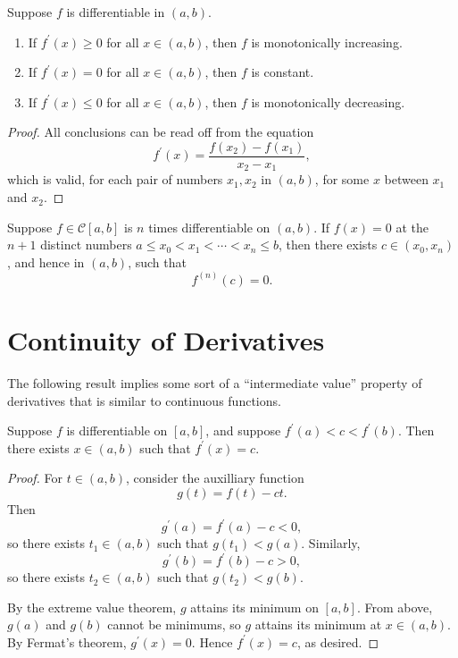 \begin{lemma}
Suppose $f$ is differentiable in $(a,b)$.
\begin{enumerate}[label=(\roman*)]
\item If $f^\prime(x)\ge0$ for all $x\in(a,b)$, then $f$ is monotonically increasing.
\item If $f^\prime(x)=0$ for all $x\in(a,b)$, then $f$ is constant.
\item If $f^\prime(x)\le0$ for all $x\in(a,b)$, then $f$ is monotonically decreasing.
\end{enumerate}
\end{lemma}

\begin{proof}
All conclusions can be read off from the equation
\[f^\prime(x)=\frac{f(x_2)-f(x_1)}{x_2-x_1},\]
which is valid, for each pair of numbers $x_1,x_2$ in $(a,b)$, for some $x$ between
$x_1$ and $x_2$.
\end{proof}

\begin{theorem}
Suppose $f\in\mathcal{C}[a,b]$ is $n$ times differentiable on $(a,b)$. If $f(x)=0$ at the $n+1$ distinct numbers $a\le x_0<x_1<\cdots<x_n\le b$, then there exists $c\in(x_0,x_n)$, and hence in $(a,b)$, such that
\[f^{(n)}(c)=0.\]
\end{theorem}
\pagebreak

\section{Continuity of Derivatives}
The following result implies some sort of a ``intermediate value'' property of derivatives that is similar to continuous functions.

\begin{theorem}
Suppose $f$ is differentiable on $[a,b]$, and suppose $f^\prime(a)<c<f^\prime(b)$. Then there exists $x\in(a,b)$ such that $f^\prime(x)=c$.
\end{theorem}

\begin{proof}
For $t\in(a,b)$, consider the auxilliary function
\[g(t)=f(t)-ct.\]
Then
\[g^\prime(a)=f^\prime(a)-c<0,\]
so there exists $t_1\in(a,b)$ such that $g(t_1)<g(a)$. Similarly,
\[g^\prime(b)=f^\prime(b)-c>0,\]
so there exists $t_2\in(a,b)$ such that $g(t_2)<g(b)$.

By the extreme value theorem, $g$ attains its minimum on $[a,b]$. From above, $g(a)$ and $g(b)$ cannot be minimums, so $g$ attains its minimum at $x\in(a,b)$. By Fermat's theorem, $g^\prime(x)=0$. Hence $f^\prime(x)=c$, as desired.
\end{proof}

